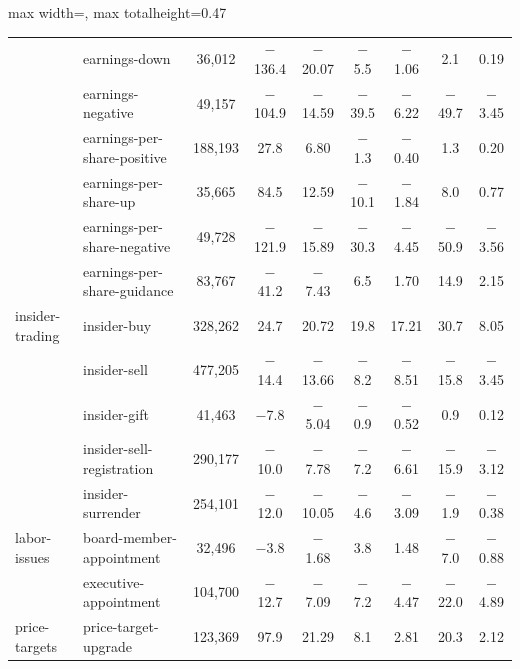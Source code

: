 \begin{table}[htbp]
{\begin{adjustbox}{max width=\linewidth, max totalheight=0.47\textheight}
\begin{tabular}{llccccccc}
 & earnings-down & \phantom{0}36,012 & $-$136.4 & $-$20.07 & \phantom{0}$-$5.5 & \phantom{0}$-$1.06 & \phantom{$-$0}2.1 & \phantom{$-$}0.19 \\
 & earnings-negative & \phantom{0}49,157 & $-$104.9 & $-$14.59 & $-$39.5 & \phantom{0}$-$6.22 & $-$49.7 & $-$3.45 \\
 & earnings-per-share-positive & 188,193 & \phantom{$-$0}27.8 & \phantom{$-$0}6.80 & \phantom{0}$-$1.3 & \phantom{0}$-$0.40 & \phantom{$-$0}1.3 & \phantom{$-$}0.20 \\
 & earnings-per-share-up & \phantom{0}35,665 & \phantom{$-$0}84.5 & \phantom{$-$}12.59 & $-$10.1 & \phantom{0}$-$1.84 & \phantom{$-$0}8.0 & \phantom{$-$}0.77 \\
 & earnings-per-share-negative & \phantom{0}49,728 & $-$121.9 & $-$15.89 & $-$30.3 & \phantom{0}$-$4.45 & $-$50.9 & $-$3.56 \\
 & earnings-per-share-guidance & \phantom{0}83,767 & \phantom{0}$-$41.2 & \phantom{0}$-$7.43 & \phantom{$-$0}6.5 & \phantom{$-$0}1.70 & \phantom{$-$}14.9 & \phantom{$-$}2.15 \\
\midrule
insider-trading & insider-buy & 328,262 & \phantom{$-$0}24.7 & \phantom{$-$}20.72 & \phantom{$-$}19.8 & \phantom{$-$}17.21 & \phantom{$-$}30.7 & \phantom{$-$}8.05 \\
 & insider-sell & 477,205 & \phantom{0}$-$14.4 & $-$13.66 & \phantom{0}$-$8.2 & \phantom{0}$-$8.51 & $-$15.8 & $-$3.45 \\
 & insider-gift & \phantom{0}41,463 & \phantom{00}$-$7.8 & \phantom{0}$-$5.04 & \phantom{0}$-$0.9 & \phantom{0}$-$0.52 & \phantom{$-$0}0.9 & \phantom{$-$}0.12 \\
 & insider-sell-registration & 290,177 & \phantom{0}$-$10.0 & \phantom{0}$-$7.78 & \phantom{0}$-$7.2 & \phantom{0}$-$6.61 & $-$15.9 & $-$3.12 \\
 & insider-surrender & 254,101 & \phantom{0}$-$12.0 & $-$10.05 & \phantom{0}$-$4.6 & \phantom{0}$-$3.09 & \phantom{0}$-$1.9 & $-$0.38 \\
\midrule
labor-issues & board-member-appointment & \phantom{0}32,496 & \phantom{00}$-$3.8 & \phantom{0}$-$1.68 & \phantom{$-$0}3.8 & \phantom{$-$0}1.48 & \phantom{0}$-$7.0 & $-$0.88 \\
 & executive-appointment & 104,700 & \phantom{0}$-$12.7 & \phantom{0}$-$7.09 & \phantom{0}$-$7.2 & \phantom{0}$-$4.47 & $-$22.0 & $-$4.89 \\
\midrule
price-targets & price-target-upgrade & 123,369 & \phantom{$-$0}97.9 & \phantom{$-$}21.29 & \phantom{$-$0}8.1 & \phantom{$-$0}2.81 & \phantom{$-$}20.3 & \phantom{$-$}2.12 \\

\end{tabular}
\end{adjustbox}}
\end{table}
